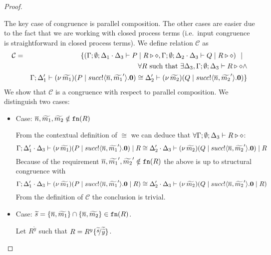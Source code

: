 \begin{proof}
\begin{itemize}
				The key case of congruence is parallel composition.
				The other cases are easier due to the fact that we are
				working with closed process terms (i.e.~input congruence is straightforward
				in closed process terms).
				We define relation $\mathcal{C}$ as
				\begin{eqnarray*}
					\mathcal{C} &=&
					\{	(\Gamma; \emptyset; \Delta_1 \cdot \Delta_3 \vdash P \;|\; R \triangleright \diamond,
							\Gamma; \emptyset; \Delta_2 \cdot \Delta_3 \vdash Q \;|\; R \triangleright \diamond) \ \ |\ \ 
					\\
					& &	\forall R \textrm{ such that } \exists \Delta_3, \Gamma;\emptyset; \Delta_3 \vdash R \triangleright \diamond \land\\
					& &	\Gamma; \Delta_1' \vdash (\nu\, \widetilde{m_1})(P \;|\; succ ! \langle \overline{n}, \widetilde{m_1}' \rangle . \mathbf{0}) \cong \Delta_2' \vdash (\nu\, \widetilde{m_2})(Q \;|\; succ ! \langle \overline{n}, \widetilde{m_2}' \rangle . \mathbf{0})\}
				\end{eqnarray*}
				We show that $\mathcal{C}$ is a congruence with respect to parallel composition.
				We distinguish two cases:
				\begin{itemize}
					\item	Case: $\overline{n}, \widetilde{m_1}, \widetilde{m_2} \notin \mathtt{fn}(R)$

							From the contextual definition of $\cong$ we can deduce that
							$\forall \Gamma; \emptyset; \Delta_3 \vdash R \triangleright \diamond$:
							\[
								\Gamma; \Delta_1' \cdot \Delta_3 \vdash (\nu\, \widetilde{m_1})(P \;|\; succ ! \langle \overline{n}, \widetilde{m_1}' \rangle . \mathbf{0}) \;|\; R \cong \Delta_2' \cdot \Delta_3 \vdash (\nu\, \widetilde{m_2})(Q \;|\; succ ! \langle \overline{n}, \widetilde{m_2}' \rangle . \mathbf{0}) \;|\; R
							\]
							Because of the requirement
							$\overline{n}, \widetilde{m_1}', \widetilde{m_2}' \notin \mathtt{fn}(R)$
							the above is up to structural congruence with
							\[
								\Gamma; \Delta_1' \cdot \Delta_3 \vdash (\nu\, \widetilde{m_1})(P \;|\; succ ! \langle \overline{n}, \widetilde{m_1}' \rangle . \mathbf{0} \;|\; R) \cong \Delta_2' \cdot \Delta_3 \vdash (\nu\, \widetilde{m_2})(Q \;|\; succ ! \langle \overline{n}, \widetilde{m_2}' \rangle . \mathbf{0} \;|\; R)
							\]
							From the definition of $\mathcal{C}$ the conclusion is trivial.

					\item	Case: $\widetilde{s} = \{\overline{n}, \widetilde{m_1}\} \cap \{\overline{n}, \widetilde{m_2}\} \in \mathtt{fn}(R)$.

							Let $R^{\widetilde{y}}$ such that $R = R^{y}\subst{\widetilde{s}}{\widetilde{\widetilde{y}}}$.



\end{itemize}
\end{itemize}
\end{proof}
